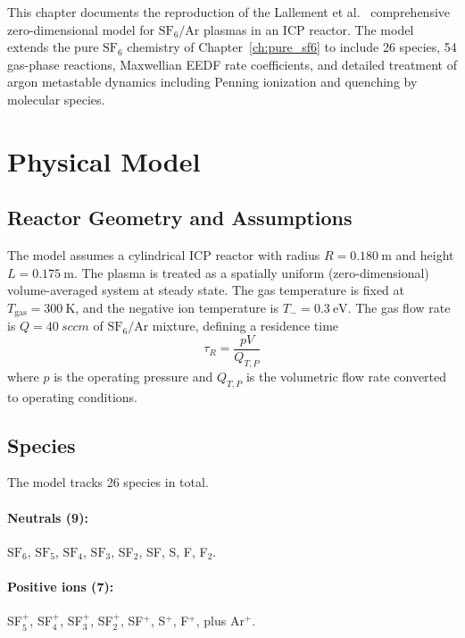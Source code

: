 \documentclass[11pt,a4paper]{report}
\newcommand{\SFsix}{\mathrm{SF}_6}
\newcommand{\SFfive}{\mathrm{SF}_5}
\newcommand{\SFfour}{\mathrm{SF}_4}
\newcommand{\SFthree}{\mathrm{SF}_3}
\newcommand{\Ar}{\mathrm{Ar}}
\begin{document}
This chapter documents the reproduction of the Lallement et al.~\cite{Lallement2009} comprehensive zero-dimensional model for $\SFsix/\Ar$ plasmas in an ICP reactor.  The model extends the pure $\SFsix$ chemistry of Chapter~\ref{ch:pure_sf6} to include 26 species, 54 gas-phase reactions, Maxwellian EEDF rate coefficients, and detailed treatment of argon metastable dynamics including Penning ionization and quenching by molecular species.

\section{Physical Model}
\label{sec:gasphase_model}

\subsection{Reactor Geometry and Assumptions}
\label{sec:gasphase_geometry}

The model assumes a cylindrical ICP reactor with radius $R = \SI{0.180}{\meter}$ and height $L = \SI{0.175}{\meter}$.  The plasma is treated as a spatially uniform (zero-dimensional) volume-averaged system at steady state.  The gas temperature is fixed at $T_\mathrm{gas} = \SI{300}{\kelvin}$, and the negative ion temperature is $T_- = \SI{0.3}{\electronvolt}$.  The gas flow rate is $Q = \SI{40}{sccm}$ of $\SFsix/\Ar$ mixture, defining a residence time
\begin{equation}
\tau_R = \frac{p V}{Q_{T,P}}
\label{eq:gas_tau}
\end{equation}
where $p$ is the operating pressure and $Q_{T,P}$ is the volumetric flow rate converted to operating conditions.

\subsection{Species}
\label{sec:gasphase_species}

The model tracks 26 species in total.

\paragraph{Neutrals (9):} $\SFsix$, $\SFfive$, $\SFfour$, $\SFthree$, SF$_2$, SF, S, F, F$_2$.

\paragraph{Positive ions (7):} SF$_5^+$, SF$_4^+$, SF$_3^+$, SF$_2^+$, SF$^+$, S$^+$, F$^+$, plus Ar$^+$.
\end{document}
